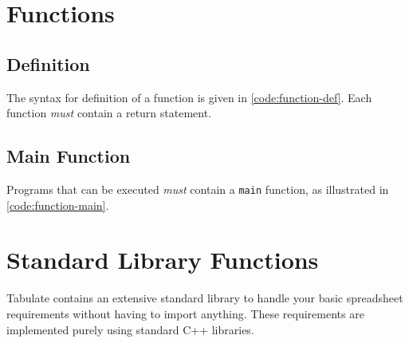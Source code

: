 \documentclass[conference,compsoc]{IEEEtran}
\begin{document}


\section{Functions}

\subsection{Definition}
The syntax for definition of a function is given in \autoref{code:function-def}.
Each function \emph{must} contain a return statement.



\subsection{Main Function}
Programs that can be executed \emph{must} contain a \texttt{main} function, as
illustrated in \autoref{code:function-main}.



\section{Standard Library Functions}
Tabulate contains an extensive standard library to handle your basic spreadsheet
requirements without having to import anything. These requirements are
implemented purely using standard C++ libraries.
\end{document}
